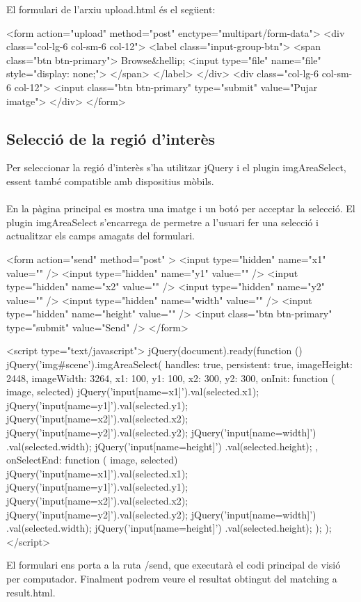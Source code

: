 \newpage
\noindent
El formulari de l'arxiu upload.html és el següent:\\

		\begin{txt}
<form action="upload" method="post" 
	enctype="multipart/form-data">
	<div class="col-lg-6 col-sm-6 col-12">
		<label class="input-group-btn">
			<span class="btn btn-primary">
				Browse&hellip; <input type="file" 
					name="file" style="display: none;">
			</span>
		</label>
	</div>
	<div class="col-lg-6 col-sm-6 col-12">
		<input class="btn btn-primary" type="submit"
			value="Pujar imatge">
	</div>
</form>
		\end{txt}

	\subsection{Selecció de la regió d'interès}
		Per seleccionar la regió d'interès s'ha utilitzar jQuery i el plugin imgAreaSelect, essent també compatible amb dispositius mòbils.\\\\
		En la pàgina principal es mostra una imatge i un botó per acceptar la selecció. El plugin imgAreaSelect s'encarrega de permetre a l'usuari fer una selecció i actualitzar els camps
		amagats del formulari.\\
		\begin{txt}
<form action="send" method="post" >
	<input type="hidden" name="x1" value="" />
	<input type="hidden" name="y1" value="" />
	<input type="hidden" name="x2" value="" />
	<input type="hidden" name="y2" value="" />
	<input type="hidden" name="width" value="" />
	<input type="hidden" name="height" value="" />
	<input class="btn btn-primary" type="submit"
		value="Send" />
</form>

<script type="text/javascript">
	jQuery(document).ready(function () {
		jQuery('img#scene').imgAreaSelect({
			handles: true,
			persistent: true,
			imageHeight: 2448,
			imageWidth: 3264,
			x1: 100, y1: 100, x2: 300, y2: 300,
			onInit: function ( image, selected) {
				jQuery('input[name=x1]').val(selected.x1);
				jQuery('input[name=y1]').val(selected.y1);
				jQuery('input[name=x2]').val(selected.x2);
				jQuery('input[name=y2]').val(selected.y2);
				jQuery('input[name=width]')
					.val(selected.width);
				jQuery('input[name=height]')
					.val(selected.height);
			},
			onSelectEnd: function ( image, selected) {
				jQuery('input[name=x1]').val(selected.x1);
				jQuery('input[name=y1]').val(selected.y1);
				jQuery('input[name=x2]').val(selected.x2);
				jQuery('input[name=y2]').val(selected.y2);
				jQuery('input[name=width]')
					.val(selected.width);
				jQuery('input[name=height]')
					.val(selected.height);
			}
		});
	});
 </script>
		\end{txt}
\noindent
El formulari ens porta a la ruta /send, que executarà el codi principal de visió per computador. Finalment podrem veure el resultat obtingut del matching a result.html.\\

